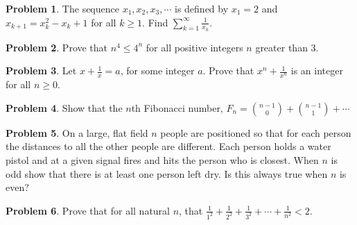 \documentclass[12pt,openany]{book}
\theoremstyle{definition}
\newtheorem{prob}{Problem}[section]
\theoremstyle{definition}
\begin{document}
\begin{prob}  The sequence $x_1, x_2, x_3, \cdots$ is defined by $x_1=2$ and $x_{k+1}=x_k^2-x_k+1$ for all $k\ge 1$.  Find $\sum_{k=1}^{\infty} \frac{1}{x_k}$.  \end{prob}  
\begin{prob}  Prove that $n^4\le 4^n$ for all positive integers $n$ greater than $3$.  \end{prob}  
\begin{prob}  Let $x+\frac{1}{x}=a$, for some integer $a$.  Prove that $x^n+\frac{1}{x^n}$ is an integer for all $n\ge 0$.  \end{prob}  
\begin{prob}  Show that the $n$th Fibonacci number, $F_n=\binom{n-1}{0}+\binom{n-1}{1}+\cdots$ \end{prob}
\begin{prob}  On a large, flat field $n$ people are positioned so that for each person the distances to all the other people are different.  Each person holds a water pistol and at a given signal fires and hits the person who is closest.  When $n$ is odd show that there is at least one person left dry.  Is this always true when $n$ is even?  \end{prob}
\begin{prob}  Prove that for all natural $n$, that $\frac{1}{1^2}+\frac{1}{2^2}+\frac{1}{3^2}+\cdots+\frac{1}{n^2}<2$.  \end{prob}  
\end{document}
